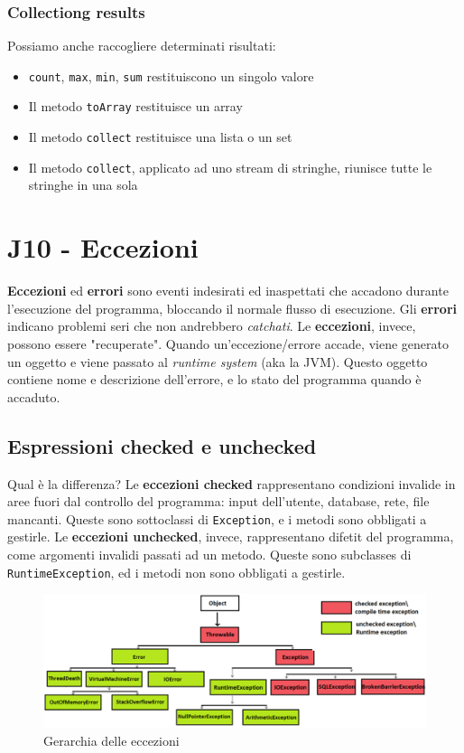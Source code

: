 \documentclass[11pt]{article}
\newcommand{\code}[1]{\texttt{#1}}
\begin{document}
\subsubsection{Collectiong results}
Possiamo anche raccogliere determinati risultati:
\begin{itemize}
    \item \code{count}, \code{max}, \code{min}, \code{sum} restituiscono un singolo valore
    \item Il metodo \code{toArray} restituisce un array 
    \item Il metodo \code{collect} restituisce una lista o un set
    \item Il metodo \code{collect}, applicato ad uno stream di stringhe, riunisce tutte le stringhe in una sola
\end{itemize}
\section{J10 - Eccezioni}
\textbf{Eccezioni} ed \textbf{errori} sono eventi indesirati ed inaspettati che accadono durante l'esecuzione del programma, bloccando il normale flusso di esecuzione. Gli \textbf{errori} indicano problemi seri che non andrebbero \textit{catchati}. Le \textbf{eccezioni}, invece, possono essere "recuperate". Quando un'eccezione/errore accade, viene generato un oggetto e viene passato al \textit{runtime system} (aka la JVM). Questo oggetto contiene nome e descrizione dell'errore, e lo stato del programma quando è accaduto.
\subsection{Espressioni checked e unchecked}
Qual è la differenza? Le \textbf{eccezioni checked} rappresentano condizioni invalide in aree fuori dal controllo del programma: input dell'utente, database, rete, file mancanti. Queste sono sottoclassi di \code{Exception}, e i metodi sono obbligati a gestirle. Le \textbf{eccezioni unchecked}, invece, rappresentano difetit del programma, come argomenti invalidi passati ad un metodo. Queste sono subclasses di \code{RuntimeException}, ed i metodi non sono obbligati a gestirle. 
\begin{figure}[H]
    \centering
    \includegraphics[width=0.8\linewidth]{res/java/Exceptions.png}
    \caption{Gerarchia delle eccezioni}
\end{figure}
\end{document}

